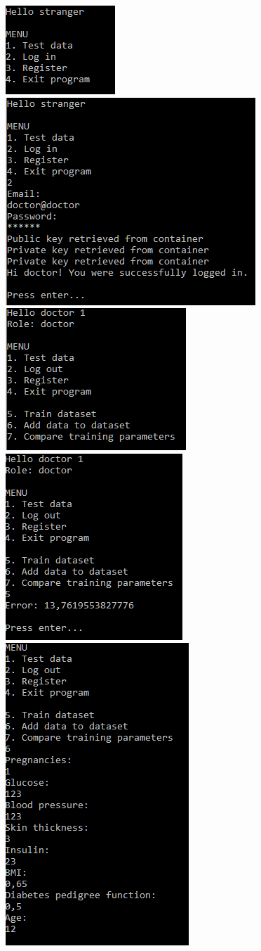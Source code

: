 \documentclass[12pt,a4paper]{article}
\begin{document}
\includegraphics[width=0.4\linewidth]{media/program1}
\includegraphics[width=0.4\linewidth]{media/program2}\\
\includegraphics[width=0.4\linewidth]{media/program3}
\includegraphics[width=0.4\linewidth]{media/program4}\\
\includegraphics[width=0.4\linewidth]{media/program5}
\end{document}
